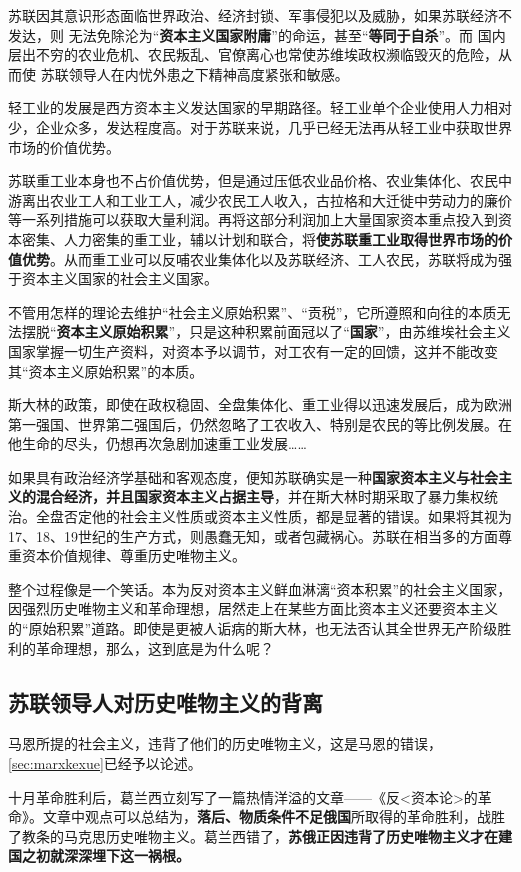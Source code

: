 苏联因其意识形态面临世界政治、经济封锁、军事侵犯以及威胁，如果苏联经济不发达，则
无法免除沦为“\textbf{资本主义国家附庸}”的命运，甚至“\textbf{等同于自杀}”。而
国内层出不穷的农业危机、农民叛乱、官僚离心也常使苏维埃政权濒临毁灭的危险，从而使
苏联领导人在内忧外患之下精神高度紧张和敏感。

轻工业的发展是西方资本主义发达国家的早期路径。轻工业单个企业使用人力相对少，企业众多，发达程度高。对于苏联来说，几乎已经无法再从轻工业中获取世界市场的价值优势。

苏联重工业本身也不占价值优势，但是通过压低农业品价格、农业集体化、农民中游离出农业工人和工业工人，减少农民工人收入，古拉格和大迁徙中劳动力的廉价等一系列措施可以获取大量利润。再将这部分利润加上大量国家资本重点投入到资本密集、人力密集的重工业，辅以计划和联合，将\textbf{使苏联重工业取得世界市场的价值优势}。从而重工业可以反哺农业集体化以及苏联经济、工人农民，苏联将成为强于资本主义国家的社会主义国家。

不管用怎样的理论去维护“社会主义原始积累”、“贡税”，它所遵照和向往的本质无法摆脱“\textbf{资本主义原始积累}”，只是这种积累前面冠以了“\textbf{国家}”，由苏维埃社会主义国家掌握一切生产资料，对资本予以调节，对工农有一定的回馈，这并不能改变其“资本主义原始积累”的本质。

斯大林的政策，即使在政权稳固、全盘集体化、重工业得以迅速发展后，成为欧洲第一强国、世界第二强国后，仍然忽略了工农收入、特别是农民的等比例发展。在他生命的尽头，仍想再次急剧加速重工业发展……

如果具有政治经济学基础和客观态度，便知苏联确实是一种\textbf{国家资本主义与社会主义的混合经济，并且国家资本主义占据主导}，并在斯大林时期采取了暴力集权统治。全盘否定他的社会主义性质或资本主义性质，都是显著的错误。如果将其视为17、18、19世纪的生产方式，则愚蠢无知，或者包藏祸心。苏联在相当多的方面尊重资本价值规律、尊重历史唯物主义。

整个过程像是一个笑话。本为反对资本主义鲜血淋漓“资本积累”的社会主义国家，因强烈历史唯物主义和革命理想，居然走上在某些方面比资本主义还要资本主义的“原始积累”道路。即使是更被人诟病的斯大林，也无法否认其全世界无产阶级胜利的革命理想，那么，这到底是为什么呢？

\subsection{苏联领导人对历史唯物主义的背离}
\label{sec:beili}

马恩所提的社会主义，违背了他们的历史唯物主义，这是马恩的错误，\cref{sec:marxkexue}已经予以论述。

十月革命胜利后，葛兰西立刻写了一篇热情洋溢的文章——《反<资本论>的革命》。文章中观点可以总结为，\textbf{落后、物质条件不足俄国}所取得的革命胜利，战胜了教条的马克思历史唯物主义。葛兰西错了，\textbf{苏俄正因违背了历史唯物主义才在建国之初就深深埋下这一祸根。}

